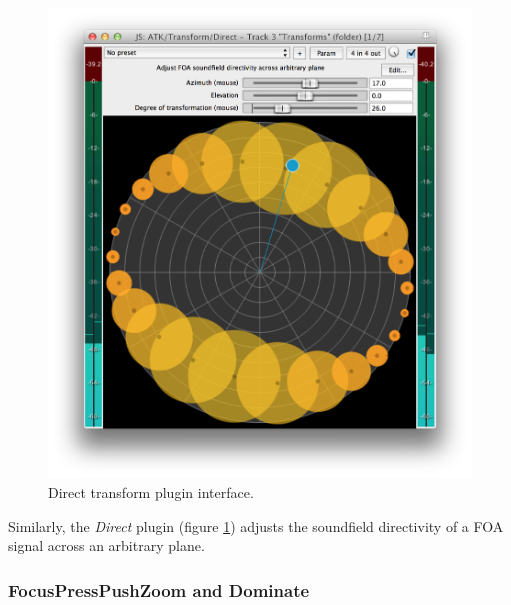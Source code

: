 \documentclass{article}
\begin{document}
\begin{figure}[h]
\captionsetup{aboveskip=-6pt}
\centering
\includegraphics[width=0.8\columnwidth]{figures/directTransform.png}
\caption{Direct transform plugin interface.\label{fig:directTransform}}
\end{figure}

Similarly, the \emph{Direct} plugin (figure \ref{fig:directTransform}) adjusts the soundfield directivity of a FOA signal across an arbitrary plane.


 
\subsubsection{FocusPressPushZoom and Dominate}\label{sec:focus}
\end{document}
